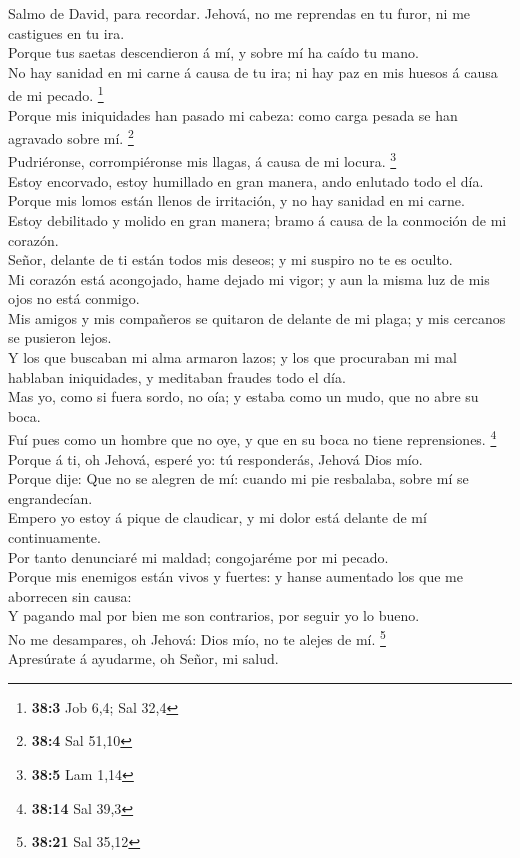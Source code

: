  Salmo de David, para recordar. Jehová, no me reprendas en
tu furor, ni me castigues en tu ira.\\
 Porque tus saetas descendieron á mí, y sobre mí ha caído tu
mano.\\
 No hay sanidad en mi carne á causa de tu ira; ni hay paz en
mis huesos á causa de mi pecado. \footnote{\textbf{38:3} Job 6,4; Sal
  32,4}\\
 Porque mis iniquidades han pasado mi cabeza: como carga
pesada se han agravado sobre mí. \footnote{\textbf{38:4} Sal 51,10}\\
 Pudriéronse, corrompiéronse mis llagas, á causa de mi
locura. \footnote{\textbf{38:5} Lam 1,14}\\
 Estoy encorvado, estoy humillado en gran manera, ando
enlutado todo el día.\\
 Porque mis lomos están llenos de irritación, y no hay
sanidad en mi carne.\\
 Estoy debilitado y molido en gran manera; bramo á causa de
la conmoción de mi corazón.\\
 Señor, delante de ti están todos mis deseos; y mi suspiro
no te es oculto.\\
 Mi corazón está acongojado, hame dejado mi vigor; y aun la
misma luz de mis ojos no está conmigo.\\
 Mis amigos y mis compañeros se quitaron de delante de mi
plaga; y mis cercanos se pusieron lejos.\\
 Y los que buscaban mi alma armaron lazos; y los que
procuraban mi mal hablaban iniquidades, y meditaban fraudes todo el
día.\\
 Mas yo, como si fuera sordo, no oía; y estaba como un
mudo, que no abre su boca.\\
 Fuí pues como un hombre que no oye, y que en su boca no
tiene reprensiones. \footnote{\textbf{38:14} Sal 39,3}\\
 Porque á ti, oh Jehová, esperé yo: tú responderás, Jehová
Dios mío.\\
 Porque dije: Que no se alegren de mí: cuando mi pie
resbalaba, sobre mí se engrandecían.\\
 Empero yo estoy á pique de claudicar, y mi dolor está
delante de mí continuamente.\\
 Por tanto denunciaré mi maldad; congojaréme por mi
pecado.\\
 Porque mis enemigos están vivos y fuertes: y hanse
aumentado los que me aborrecen sin causa:\\
 Y pagando mal por bien me son contrarios, por seguir yo lo
bueno.\\
 No me desampares, oh Jehová: Dios mío, no te alejes de mí.
\footnote{\textbf{38:21} Sal 35,12}\\
 Apresúrate á ayudarme, oh Señor, mi salud.


